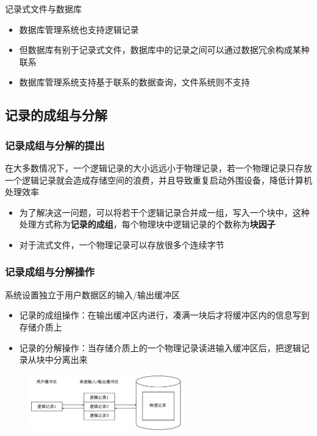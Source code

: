 \documentclass[cs4size,a4paper,10pt]{ctexart}
\begin{document}
	记录式文件与数据库
	\begin{itemize}
		\item 数据库管理系统也支持逻辑记录
		\item 但数据库有别于记录式文件，数据库中的记录之间可以通过数据冗余构成某种联系
		\item 数据库管理系统支持基于联系的数据查询，文件系统则不支持
	\end{itemize}

	\subsection{记录的成组与分解}

	\subsubsection{记录成组与分解的提出}
	在大多数情况下，一个逻辑记录的大小远远小于物理记录，若一个物理记录只存放一个逻辑记录就会造成存储空间的浪费，并且导致重复启动外围设备，降低计算机处理效率
	\begin{itemize}
		\item 为了解决这一问题，可以将若干个逻辑记录合并成一组，写入一个块中，这种处理方式称为\textbf{记录的成组}，每个物理块中逻辑记录的个数称为\textbf{块因子}
		\item 对于流式文件，一个物理记录可以存放很多个连续字节
	\end{itemize}

	\subsubsection{记录成组与分解操作}
	系统设置独立于用户数据区的输入/输出缓冲区
	\begin{itemize}
		\item 记录的成组操作：在输出缓冲区内进行，凑满一块后才将缓冲区内的信息写到存储介质上
		\item 记录的分解操作：当存储介质上的一个物理记录读进输入缓冲区后，把逻辑记录从块中分离出来
	\end{itemize}
	\begin{figure}[H]
		\centering
		\includegraphics[width=0.6\textwidth]{img/5.2.3.2}
	\end{figure}
\end{document}
